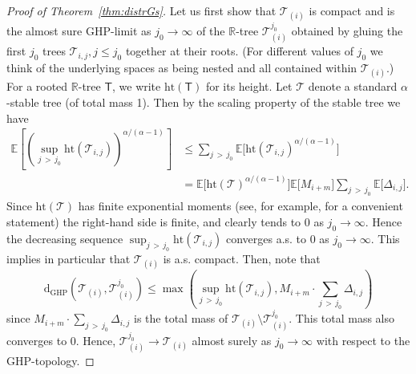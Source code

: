 \documentclass[AHL,Unicode,longabstracts,published]{cedram}
\newcommand{\E}[1]{\ensuremath{\mathbb{E} \left[#1 \right]}}
\newcommand{\GHP}{\mathrm{GHP}}
\newcommand{\rmd}{\mathrm{d}}
\newcommand{\htl}{\mathrm{ht}}
\newcommand{\cT}{\mathcal{T}}
\newcommand{\sT}{\mathsf{T}}
\newcommand{\R}{\mathbb{R}}
\newcommand{\bbE}{\mathbb{E}}
\newcommand{\R}{\mathbb{R}}
\begin{document}
\begin{proof}[Proof of Theorem~\ref{thm:distrGs}]
Let us first show that $\cT_{(i)}$ is compact and is the almost sure GHP-limit as $j_0 \rightarrow \infty$ of the $\R$-tree $\cT_{(i)}^{j_0}$ obtained by gluing the first $j_0$ trees $\cT_{i,j},j\leq j_0$ together at their roots. (For different values of $j_0$ we think of the underlying spaces as being nested and all contained within $\cT_{(i)}$.) For a rooted $\R$-tree $\sT$, we write $\htl(\sT)$ for its height. Let $\cT$ denote a standard $\alpha$-stable tree (of total mass 1). Then by the scaling property of the stable tree we have
\begin{align*}
\E{ \left(\sup_{j\,>\,j_0}\htl\left(\cT_{i,j}\right)\right)^{\alpha/(\alpha-1)}}
&\le \sum_{j\,>\,j_0} \bbE\big[\htl\left(\cT_{i,j}\right)^{\alpha/(\alpha-1)}\big]\\
&= \bbE\big[\htl(\cT)^{\alpha/(\alpha-1)}\big] \bbE\big[M_{i+m}\big] \sum_{j\,>\,j_0} \bbE\big[\Delta_{i,j}\big].
\end{align*}
Since $\htl(\cT)$ has finite exponential moments (see, for example, \cite[equation~(2)]{Kortchemski} for a convenient statement) the right-hand side is finite, and clearly tends to 0 as $j_0 \to \infty$. Hence the decreasing sequence $\sup_{j\,>\,j_0}\htl(\cT_{i,j})$ converges a.s. to 0 as $j_0 \to \infty$. This implies in particular that $\cT_{(i)}$ is a.s. compact. Then, note that
\[
\rmd_{\GHP}\left(\cT_{(i)},\cT_{(i)}^{j_0}\right)\le \max\left(\sup_{j\,>\,j_0}\htl\left(\cT_{i,j}\right), M_{i+m} \cdot \sum_{j\,>\,j_0} \Delta_{i,j} \right)
\]
since $M_{i+m} \cdot \sum_{j\,>\,j_0} \Delta_{i,j}$ is the total mass of $\cT_{(i)} \setminus \cT_{(i)}^{j_0}$. This total mass also converges to 0. Hence, $\cT_{(i)}^{j_0} \to \cT_{(i)}$ almost surely as $j_0 \to \infty$ with respect to the GHP-topology.


\end{proof}
\end{document}
